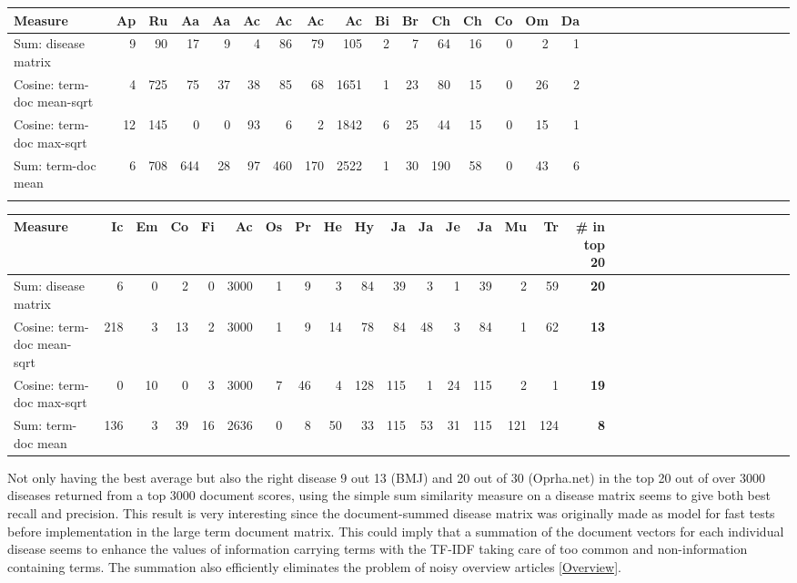 \begin{table}[H]
\label{testResult_termDoc_orphan_hist_3000_sum_dm_mea_cos_sqrt_td_max_cos_sqrt_td_mea_sum_nn_td}
\begin{tiny}
  \begin{tabular}{|l|r|r|r|r|r|r|r|r|r|r|r|r|r|r|r|r|r|r|r|r|r|r|r|r|r|r|r|r|r|r|r|}
    \hline
    Measure &Ap&Ru&Aa&Aa&Ac&Ac&Ac&Ac&Bi&Br&Ch&Ch&Co&Om&Da\\
    \hline
    Sum: disease matrix &9&90&17&9&4&86&79&105&2&7&64&16&0&2&1\\
    \hline
    Cosine: term-doc mean-sqrt &4&725&75&37&38&85&68&1651&1&23&80&15&0&26&2\\
    \hline
    Cosine: term-doc max-sqrt &12&145&0&0&93&6&2&1842&6&25&44&15&0&15&1\\
    \hline
    Sum: term-doc mean &6&708&644&28&97&460&170&2522&1&30&190&58&0&43&6 \\
    \hline
    \multicolumn{16}{c}{} \\
    \end{tabular}
    \begin{tabular}{|l|r|r|r|r|r|r|r|r|r|r|r|r|r|r|r|r|r|r|r|r|r|r|r|r|r|r|r|r|r|r|}
    \hline
     Measure &Ic&Em&Co&Fi&Ac&Os&Pr&He&Hy&Ja&Ja&Je&Ja&Mu&Tr &\scriptsize{\textbf{\# in top 20}} \\
    \hline
    Sum: disease matrix &6&0&2&0&3000&1&9&3&84&39&3&1&39&2&59 & \scriptsize{\textbf{20}} \\
    \hline
    Cosine: term-doc mean-sqrt &218&3&13&2&3000&1&9&14&78&84&48&3&84&1&62 & \scriptsize{\textbf{13}} \\
    \hline
    Cosine: term-doc max-sqrt &0&10&0&3&3000&7&46&4&128&115&1&24&115&2&1 & \scriptsize{\textbf{19}} \\
    \hline
    Sum: term-doc mean &136&3&39&16&2636&0&8&50&33&115&53&31&115&121&124 & \scriptsize{\textbf{8}} \\
    \hline
  \end{tabular}
\end{tiny}
\end{table}

Not only having the best average but also the right disease 9 out 13 (BMJ) and 20 out of 30 (Oprha.net) 
in the top 20 out of over 3000 diseases returned from a top 3000 document scores, using the simple sum 
similarity measure on a disease matrix seems to give both best recall and precision. This result is very 
interesting since the document-summed disease matrix was originally made as model for fast tests before 
implementation in the large term document matrix. This could imply that a summation of the document vectors 
for each individual disease seems to enhance the values of information carrying terms with the TF-IDF taking 
care of too common and non-information containing terms. The summation also efficiently eliminates the problem 
of noisy overview articles \ref{Overview}.

